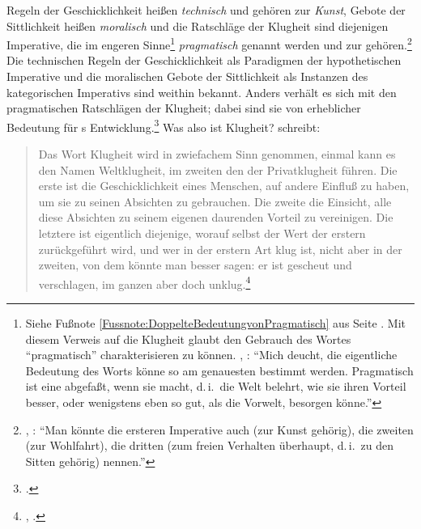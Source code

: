Regeln der Geschicklichkeit heißen \emph{technisch} und gehören zur
\emph{Kunst}, Gebote der Sittlichkeit heißen \emph{moralisch} und die Ratschläge der Klugheit sind
diejenigen Imperative, die im engeren Sinne\footnote{Siehe Fußnote
\ref{Fussnote:DoppelteBedeutungvonPragmatisch} aus Seite
\pageref{Fussnote:DoppelteBedeutungvonPragmatisch}. Mit diesem Verweis auf die
Klugheit glaubt  den Gebrauch des Wortes
\enquote{pragmatisch} charakterisieren zu können.
\cite[Vgl.][BA~4]{Kant:GrundlegungzurMetaphysikderSitten1965}, \cite[IV:
417.32--37]{Kant:GesammelteWerke1900ff.}: \enquote{Mich deucht, die eigentliche
Bedeutung des Worts  könne so am genauesten bestimmt werden.
{\punkt} Pragmatisch ist eine  abgefaßt, wenn sie 
macht, d.\,i.\ die Welt belehrt, wie sie ihren Vorteil besser, oder wenigstens
eben so gut, als die Vorwelt, besorgen könne.}} \emph{pragmatisch} genannt
werden und zur 
gehören.\footnote{\cite[Vgl.][BA~44]{Kant:GrundlegungzurMetaphysikderSitten1965},
\cite[IV: 416.28--417.2]{Kant:GesammelteWerke1900ff.}: \enquote{Man könnte die
ersteren Imperative auch  (zur Kunst gehörig), die zweiten
 (zur Wohlfahrt), die dritten  (zum freien
Verhalten überhaupt, d.\,i.\ zu den Sitten gehörig) nennen.}} Die technischen
Regeln der Geschicklichkeit als Paradigmen der hypothetischen Imperative und die
moralischen Gebote der Sittlichkeit als Instanzen des kategorischen Imperativs
sind weithin bekannt. Anders verhält es sich mit den pragmatischen Ratschlägen
der Klugheit; dabei sind sie von erheblicher Bedeutung für
s
Entwicklung.\footnote{\cite[Vgl.][149]{Schwaiger:KlugheitbeiKant2002}.}
\label{Absatz:Weltklugheit}Was also ist Klugheit?
 schreibt:
\begin{quote}
  Das Wort Klugheit wird in zwiefachem Sinn genommen, einmal kann es den Namen
  Weltklugheit, im zweiten den der Privatklugheit führen. Die erste ist die
  Geschicklichkeit eines Menschen, auf andere Einfluß zu haben, um sie zu seinen
  Absichten zu gebrauchen. Die zweite die Einsicht, alle diese Absichten zu
  seinem eigenen daurenden Vorteil zu vereinigen. Die letztere ist eigentlich
  diejenige, worauf selbst der Wert der erstern zurückgeführt wird, und wer in
  der erstern Art klug ist, nicht aber in der zweiten, von dem könnte man besser
  sagen: er ist gescheut und verschlagen, im ganzen aber doch
  unklug.\footnote{\cite[BA~42]{Kant:GrundlegungzurMetaphysikderSitten1965},
  \cite[IV: 416.30--37]{Kant:GesammelteWerke1900ff.}.}
\end{quote}
